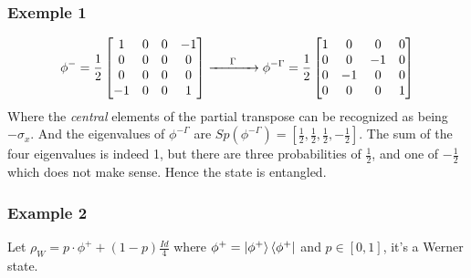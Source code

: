 \documentclass{article}
\begin{document}
\subsubsection*{Exemple 1}
\begin{equation}
    \phi^- = \frac{1}{2}\begin{bmatrix}
        1 & 0 & 0 &-1 \\
        0 & 0 & 0 & 0 \\
        0 & 0 & 0 & 0 \\
       -1 & 0 & 0 & 1
    \end{bmatrix}
    \xrightarrow{\hspace*{0.5cm}\Gamma\hspace*{0.5cm}}
    \phi^{-\Gamma} = \frac{1}{2}\begin{bmatrix}
        1 & 0 & 0 & 0 \\
        0 & 0 & -1 & 0 \\
        0 & -1 & 0 & 0 \\
        0 & 0 & 0 & 1
    \end{bmatrix}
\end{equation}
Where the \textit{central} elements of the partial transpose
can be recognized as being $-\sigma_x$. And the eigenvalues of
$\phi^{-\Gamma}$ are
$Sp(\phi^{-\Gamma})=[\frac{1}{2},\frac{1}{2},\frac{1}{2},-\frac{1}{2}]$.
The sum of the four eigenvalues is indeed 1, but there are three probabilities
of $\frac{1}{2}$, and one of $-\frac{1}{2}$ which does not make sense. Hence
the state is entangled.

\subsubsection*{Example 2}
Let $\rho_W = p\cdot\phi^+ + (1-p) \frac{Id}{4}$ where
$\phi^+ = \ket{\phi^+} \bra{\phi^+}$ and $p\in [0, 1]$, it's a Werner state.
\end{document}
